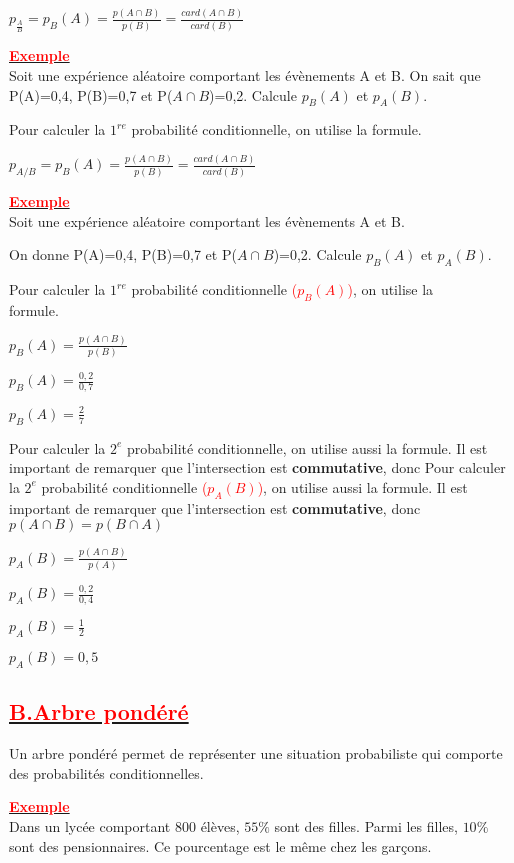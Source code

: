 \documentclass[12pt]{article}
\begin{document}
$p_{\frac{A}{B}}=p_{B}(A)=\frac{p(A\cap B)}{p(B)}=\frac{card(A\cap B)}{card(B)}$

\underline{\textbf{\textcolor{red}{Exemple}}}\\
Soit une expérience aléatoire comportant les évènements A et B. On sait que
P(A)=0,4,  P(B)=0,7 et P($A\cap B$)=0,2. Calcule $p_{B}(A)$ et $p_{A}(B)$.

Pour calculer la $1^{re}$ probabilité conditionnelle, on utilise la formule.

$p_{A/B}=p_{B}(A)=\frac{p(A\cap B)}{p(B)}=\frac{card(A\cap B)}{card(B)}$

\underline{\textbf{\textcolor{red}{Exemple}}}\\
Soit une expérience aléatoire comportant les évènements A et B.

On donne
P(A)=0,4,  P(B)=0,7 et P($A\cap B$)=0,2. Calcule $p_{B}(A)$ et $p_{A}(B)$.

Pour calculer la $1^{re}$ probabilité conditionnelle  \textcolor{red}{($p_{B}(A)$)}, on utilise la\\ formule.

$p_{B}(A)=\frac{p(A\cap B)}{p(B)}$

$p_{B}(A)=\frac{0,2}{0,7}$

$p_{B}(A)=\frac{2}{7}$

Pour calculer la $2^{e}$ probabilité conditionnelle, on utilise aussi la formule. Il est important de remarquer que l’intersection est \textbf{commutative}, donc 
Pour calculer la $2^{e}$ probabilité conditionnelle \textcolor{red}{($p_{A}(B)$)}, on utilise aussi la formule. Il est important de remarquer que l’intersection est \textbf{commutative}, donc 
$p(A\cap B)=p(B\cap A)$

$p_{A}(B)=\frac{p(A\cap B)}{p(A)}$

$p_{A}(B)=\frac{0,2}{0,4}$

$p_{A}(B)=\frac{1}{2}$

$p_{A}(B)=0,5$
\subsection*{\underline{\textbf{\textcolor{red}{B.Arbre pondéré}}}}
Un arbre pondéré permet de représenter une situation probabiliste qui comporte des probabilités conditionnelles.

\underline{\textbf{\textcolor{red}{Exemple }}}\\
Dans un lycée comportant 800 élèves, $55\%$ sont des filles. Parmi les filles, $10\%$ sont des pensionnaires. Ce pourcentage est le même chez les garçons.
\end{document}
